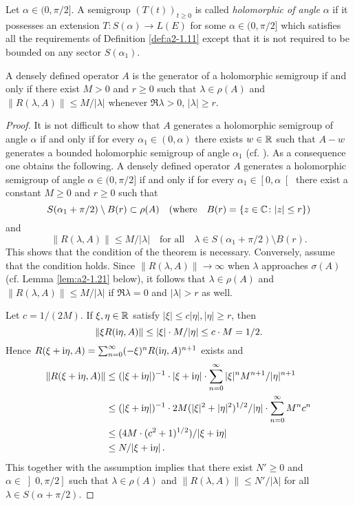 \smallskip
Let $\alpha \in (0,\pi/2]$.
A semigroup $(T(t))_{t \geq 0}$ is called \emph{holomorphic of angle} $\alpha$ if it possesses an extension $T \colon S(\alpha) \to L(E)$ for some $\alpha \in (0,\pi/2]$ which satisfies all the requirements of Definition \ref{def:a2-1.11} except that it is not required to be bounded on any sector $S(\alpha_{1})$.
\begin{theorem}\label{thm:a2-1.14}
A densely defined operator $A$ is the generator of a holomorphic semigroup if and only if there exist $M > 0$ and $r \geq 0$ such that $\lambda \in \rho(A)$ and $\|R(\lambda,A)\| \leq M/|\lambda|$ whenever $\Re\lambda > 0$, $|\lambda| \geq r$.
\end{theorem}
\begin{proof}
It is not difficult to show that $A$ generates a holomorphic semigroup of angle $\alpha$ if and only if for every $\alpha_{1} \in (0,\alpha)$ there exists 
$w \in \mathbb{R}$ such that $A - w$ generates a bounded holomorphic semigroup of angle 
$\alpha_{1}$ (cf. \citet[p.252]{reedsimon:1978}).
As a consequence one obtains the following.
A densely defined operator $A$ generates a holomorphic semigroup of angle $\alpha \in (0,\pi/2]$ if and only if for every $\alpha_{1} \in \left[0,\alpha\right[$ there exist a constant $M \geq 0$ and $r \geq 0$ such that 
\[
S(\alpha_{1} + \pi/2) \setminus B(r) \subset \rho(A) \quad (\text{where} \quad B(r) = \{z \in \mathbb{C} \colon |z| \leq r\})
\]
and
\[
\|R(\lambda,A)\| \leq M/|\lambda|  \quad \text{for all}  \quad \lambda \in S(\alpha_{1}+\pi/2) \setminus B(r).
\]
This shows that the condition of the theorem is necessary.
Conversely, assume that the condition holds.
Since $\|R(\lambda,A)\| \to \infty$ when $\lambda$ approaches $\sigma(A)$ (cf. Lemma  \ref{lem:a2-1.21}   below), 
it follows that $\lambda \in \rho(A)$ and $\|R(\lambda,A)\| \leq M/|\lambda|$ if $\Re\lambda = 0$ and $|\lambda| > r$ as well.

Let $c = 1/(2M)$.
If $\xi, \eta \in \mathbb{R}$ satisfy 
$|\xi| \leq c|\eta|, |\eta| \geq r$, 
then 
\[
\|\xi R(\mathrm{i}\eta,A)\| \leq |\xi| \cdot M/|\eta| \leq c \cdot M = 1/2.
\]
Hence $R(\xi+\mathrm{i}\eta,A) = \sum_{n=0}^\infty (-\xi)^{n}R(\mathrm{i}\eta,A)^{n+1}$ exists and 
\begin{align*}
    \|R(\xi+\mathrm{i}\eta,A)\| &\leq 
    (|\xi + \mathrm{i}\eta|)^{-1} \cdot |\xi + \mathrm{i}\eta| \cdot \sum_{n=0}^\infty |\xi|^{n}M^{n+1}/|\eta|^{n+1}\\
    &\leq  (|\xi + \mathrm{i}\eta|)^{-1} \cdot 2M (|\xi|^{2} + |\eta|^{2})^{1/2} / |\eta| \cdot \sum_{n=0}^\infty M^{n}c^{n}\\   
    &\leq  (4M\cdot(c^{2}+1)^{1/2})/|\xi+\mathrm{i}\eta| \\
    &\leq N/|\xi+\mathrm{i}\eta| \, . 
\end{align*}
This together with the assumption implies that there exist $N' \geq 0$ and $\alpha \in \left]0,\pi/2\right]$ such that $\lambda \in \rho(A)$ and $\|R(\lambda,A)\| \leq N'/|\lambda|$ for all $\lambda \in S(\alpha+\pi/2)$.
\end{proof}
